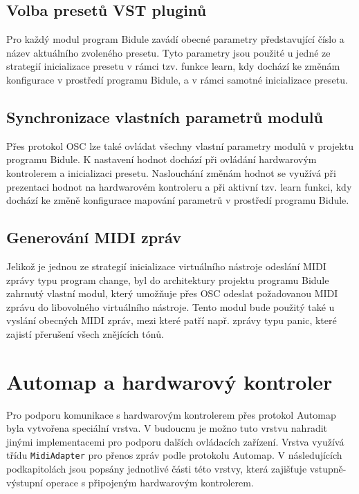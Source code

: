 \documentclass[thesis=M,czech]{FITthesis}[2019/03/06]
\begin{document}
		\subsection{Volba presetů VST pluginů}
		Pro každý modul program Bidule zavádí obecné parametry představující číslo a název aktuálního zvoleného presetu.
		Tyto parametry jsou použité u jedné ze strategií inicializace presetu v rámci tzv. funkce learn, kdy dochází
		ke změnám konfigurace v prostředí programu Bidule, a v rámci samotné inicializace presetu.

		\subsection{Synchronizace vlastních parametrů modulů}
		Přes protokol OSC lze také ovládat všechny vlastní parametry modulů v projektu programu Bidule.
		K nastavení hodnot dochází při ovládání hardwarovým kontrolerem a inicializaci presetu.
		Naslouchání změnám hodnot se využívá při prezentaci hodnot na hardwarovém kontroleru
		a při aktivní tzv. learn funkci, kdy dochází ke změně konfigurace mapování parametrů v prostředí programu Bidule.

		\subsection{Generování MIDI zpráv}
		Jelikož je jednou ze strategií inicializace virtuálního nástroje odeslání MIDI zprávy typu program change,
		byl do architektury projektu programu Bidule zahrnutý vlastní modul, který umožňuje přes OSC odeslat požadovanou MIDI zprávu
		do libovolného virtuálního nástroje. Tento modul bude použitý také u vyslání obecných MIDI zpráv,
		mezi které patří např. zprávy typu panic, které zajistí přerušení všech znějících tónů.
	
	\section{Automap a hardwarový kontroler}\label{sec:automap-hw-controller}
		Pro podporu komunikace s hardwarovým kontrolerem přes protokol Automap byla vytvořena speciální vrstva.
		V budoucnu je možno tuto vrstvu nahradit jinými implementacemi pro podporu dalších ovládacích zařízení.
		Vrstva využívá třídu \texttt{MidiAdapter} pro přenos zpráv podle protokolu Automap.
		V následujících podkapitolách jsou popsány jednotlivé části této vrstvy, která zajišťuje
		vstupně-výstupní operace s připojeným hardwarovým kontrolerem. 
\end{document}
